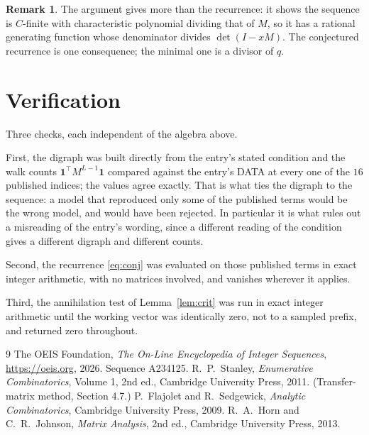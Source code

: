 \documentclass[11pt,a4paper]{article}
\theoremstyle{plain}
\theoremstyle{definition}
\newtheorem{remark}[theorem]{Remark}
\begin{document}
\begin{remark}
The argument gives more than the recurrence: it shows the sequence is $C$-finite with
characteristic polynomial dividing that of $M$, so it has a rational generating function
whose denominator divides $\det(I-xM)$. The conjectured recurrence is one consequence; the
minimal one is a divisor of $q$.
\end{remark}

\section{Verification}

Three checks, each independent of the algebra above.

First, the digraph was built directly from the entry's stated condition and the walk counts
$\mathbf{1}^{\!\top}M^{L-1}\mathbf{1}$ compared against the entry's DATA at
every one of the $16$ published indices; the values agree exactly. That is what ties
the digraph to the sequence: a model that reproduced only some of the published terms would
be the wrong model, and would have been rejected. In particular it is what rules out a
misreading of the entry's wording, since a different reading of the condition gives a
different digraph and different counts.

Second, the recurrence \eqref{eq:conj} was evaluated on those published terms in exact
integer arithmetic, with no matrices involved, and vanishes wherever it applies.

Third, the annihilation test of Lemma~\ref{lem:crit} was run in exact integer arithmetic
until the working vector was identically zero, not to a sampled prefix, and returned zero
throughout.

\begin{thebibliography}{9}
 The OEIS Foundation, \emph{The On-Line Encyclopedia of Integer
Sequences}, \url{https://oeis.org}, 2026. Sequence A234125.
 R.~P.~Stanley, \emph{Enumerative Combinatorics}, Volume 1, 2nd ed.,
Cambridge University Press, 2011. (Transfer-matrix method, Section 4.7.)
 P.~Flajolet and R.~Sedgewick, \emph{Analytic Combinatorics}, Cambridge
University Press, 2009.
 R.~A.~Horn and C.~R.~Johnson, \emph{Matrix Analysis}, 2nd ed., Cambridge
University Press, 2013.
\end{thebibliography}
\end{document}
